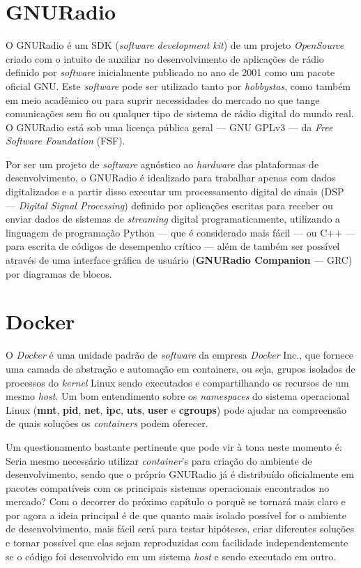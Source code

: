 \documentclass[
  12pt,				%
  openright,			%
  twoside,			%
  a4paper,			%
  english,			%
  french,				%
  spanish,			%
  brazil,				%
  ]{abntex2}
\begin{document}
\section*{GNURadio}

O GNURadio é um SDK (\textit{software development kit}) de um projeto \textit{OpenSource} criado com o intuito de auxiliar no desenvolvimento de aplicações de
rádio definido por \textit{software} inicialmente publicado no ano de 2001 como um pacote oficial GNU. Este \textit{software} pode ser utilizado tanto por \textit{hobbystas}, como
também em meio acadêmico ou para suprir necessidades do mercado no que tange comunicações sem fio ou qualquer tipo de sistema de rádio digital do mundo real.
O GNURadio está sob uma licença pública geral — GNU GPLv3 — da \textit{Free Software Foundation} (FSF).

Por ser um projeto de \textit{software} agnóstico ao \textit{hardware} das plataformas de desenvolvimento, o GNURadio é idealizado
para trabalhar apenas com dados digitalizados e a partir disso executar um processamento digital de sinais (DSP — \textit{Digital Signal Processing})
definido por aplicações escritas para receber ou enviar dados de sistemas de \textit{streaming} digital programaticamente, utilizando a linguagem de programação
Python — que é considerado mais fácil — ou C++ — para escrita de códigos de desempenho crítico — além de também ser possível através de uma interface gráfica de
usuário (\textbf{GNURadio Companion} — GRC) por diagramas de blocos.

\newpage
\section*{Docker}

O \textit{Docker} é uma unidade padrão de \textit{software} da empresa \textit{Docker} Inc., que fornece uma camada de abstração e automação em containers, ou seja, grupos isolados de
processos do \textit{kernel} Linux sendo executados e compartilhando os recursos de um mesmo \textit{host}. Um bom entendimento sobre os \textit{namespaces} do  sistema operacional
Linux (\textbf{mnt}, \textbf{pid}, \textbf{net}, \textbf{ipc}, \textbf{uts}, \textbf{user} e \textbf{cgroups}) pode ajudar na compreensão de quais soluções os
\textit{containers} podem oferecer.

Um questionamento bastante pertinente que pode vir à tona neste momento é: Seria mesmo necessário utilizar \textit{container}'s para criação
do ambiente de desenvolvimento, sendo que o próprio GNURadio já é distribuído oficialmente em pacotes compatíveis com os principais sistemas
operacionais encontrados no mercado? Com o decorrer do próximo capítulo o porquê se tornará mais claro e por agora a ideia principal é de
que quanto mais isolado possível for o ambiente de desenvolvimento, mais fácil será para testar hipóteses, criar diferentes soluções e tornar
possível que elas sejam reproduzidas com facilidade independentemente se o código foi desenvolvido em um sistema \textit{host} e sendo executado em outro.
\end{document}
